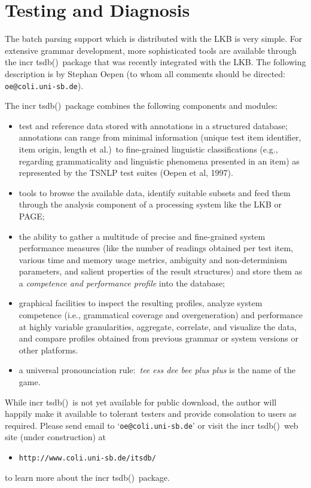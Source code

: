 \documentclass[12pt]{report}
\newcommand{\itsdb}{{\sf \lbrack incr tsdb()\rbrack}}
\begin{document}
\section{Testing and Diagnosis}
\label{tsdb}

The batch parsing support which is distributed with the
LKB is very simple.  For extensive grammar development,
more sophisticated tools
are available through the \itsdb\ package that was recently
integrated with the LKB.  The following description is by Stephan Oepen
(to whom all comments should be directed: {\tt oe@coli.uni-sb.de}).

The \itsdb\ package combines the following components and modules:
\begin{itemize}

\item test and reference data stored with annotations in a structured database;
annotations can range from minimal information (unique test item
identifier, item origin, length et al.)\ to fine-grained linguistic
classifications (e.g., regarding grammaticality and linguistic
phenomena presented in an item) as represented by the TSNLP test
suites (Oepen et al, 1997).

\item tools to browse the available data, identify suitable subsets and feed
them through the analysis component of a processing system like
the LKB or PAGE;

\item the ability to gather a multitude of precise and fine-grained system
performance measures (like the number of readings obtained per test
item, various time and memory usage metrics, ambiguity and
non-determinism parameters, and salient properties of the result
structures) and store them as a {\em competence and performance
profile\/} into the database;

\item graphical facilities to inspect the resulting profiles, analyze
system competence (i.e., grammatical coverage and
overgeneration) and performance at highly variable
granularities, aggregate, correlate, and visualize the data,
and compare profiles obtained from previous grammar or system
versions or other platforms.

\item a universal pronounciation rule:\ {\em tee ess dee bee plus 
plus\/} is the name of the game.
\end{itemize}

While \itsdb\ is not yet available for public download, the author will
happily make it available to tolerant testers and provide consolation
to users as required.
Please send email to `{\tt oe@coli.uni-sb.de}' or visit the \itsdb\ web
site (under construction) at
\begin{itemize}
  \item [] {\tt http://www.coli.uni-sb.de/itsdb/}
\end{itemize}
to learn more about the \itsdb\ package.
\end{document}
